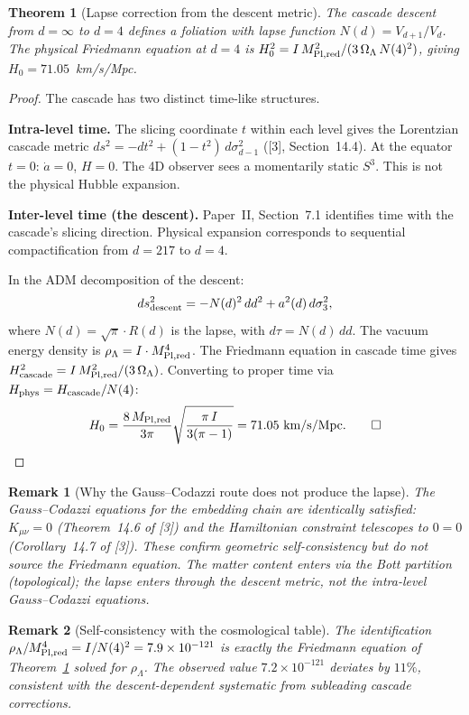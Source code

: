 \documentclass[12pt,a4paper]{article}
\newtheorem{theorem}{Theorem}[section]
\newtheorem*{remark}{Remark}
\begin{document}
\begin{theorem}[Lapse correction from the descent metric]\label{thm:lapse}
The cascade descent from $d = \infty$ to $d = 4$ defines a foliation with lapse function
$N(d) = V_{d+1}/V_d$. The physical Friedmann equation at $d = 4$ is
$H_0^2 = I\,M_{\rm Pl,red}^2/(3\,\Omega_\Lambda\,N(4)^2)$, giving $H_0 = 71.05$~km/s/Mpc.
\end{theorem}

\begin{proof}
The cascade has two distinct time-like structures.

\textbf{Intra-level time.} The slicing coordinate $t$ within each level gives the Lorentzian
cascade metric $ds^2 = -dt^2 + (1-t^2)\,d\sigma_{d-1}^2$ ([3], Section~14.4). At the equator
$t = 0$: $\dot{a} = 0$, $H = 0$. The 4D observer sees a momentarily static $S^3$. This
is not the physical Hubble expansion.

\textbf{Inter-level time (the descent).} Paper~II, Section~7.1 identifies time with the
cascade's slicing direction. Physical expansion corresponds to sequential compactification
from $d = 217$ to $d = 4$.

In the ADM decomposition of the descent:
\[
ds^2_{\rm descent} = -N(d)^2\,dd^2 + a^2(d)\,d\sigma_3^2,
\]
where $N(d) = \sqrt{\pi}\cdot R(d)$ is the lapse, with $d\tau = N(d)\,dd$. The vacuum
energy density is $\rho_\Lambda = I \cdot M_{\rm Pl,red}^4$. The Friedmann equation in cascade
time gives $H_{\rm cascade}^2 = I\,M_{\rm Pl,red}^2/(3\,\Omega_\Lambda)$. Converting to proper time
via $H_{\rm phys} = H_{\rm cascade}/N(4)$:
\[
H_0 = \frac{8\,M_{\rm Pl,red}}{3\pi}\sqrt{\frac{\pi\,I}{3(\pi-1)}} = 71.05~\text{km/s/Mpc}.\qquad\square
\]
\end{proof}

\begin{remark}[Why the Gauss--Codazzi route does not produce the lapse]
The Gauss--Codazzi equations for the embedding chain are identically satisfied:
$K_{\mu\nu} = 0$ (Theorem~14.6 of [3]) and the Hamiltonian constraint telescopes to
$0 = 0$ (Corollary~14.7 of [3]). These confirm geometric self-consistency but do not
source the Friedmann equation. The matter content enters via the Bott partition (topological);
the lapse enters through the descent metric, not the intra-level Gauss--Codazzi equations.
\end{remark}

\begin{remark}[Self-consistency with the cosmological table]
The identification $\rho_\Lambda/M_{\rm Pl,red}^4 = I/N(4)^2 = 7.9 \times 10^{-121}$ is exactly
the Friedmann equation of Theorem~\ref{thm:lapse} solved for $\rho_\Lambda$. The observed
value $7.2 \times 10^{-121}$ deviates by $11\%$, consistent with the descent-dependent
systematic from subleading cascade corrections.
\end{remark}
\end{document}
